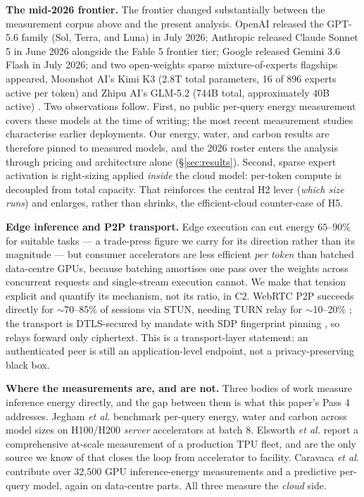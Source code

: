\documentclass[conference]{IEEEtran}
\begin{document}
\textbf{The mid-2026 frontier.}
The frontier changed substantially between the measurement corpus above and the
present analysis. OpenAI released the GPT-5.6 family (Sol, Terra, and Luna) in
July 2026; Anthropic released Claude Sonnet 5 in June 2026 alongside the Fable 5
frontier tier; Google released Gemini 3.6 Flash in July 2026; and two
open-weights sparse mixture-of-experts flagships appeared, Moonshot AI's Kimi K3
(2.8T total parameters, 16 of 896 experts active per token) and Zhipu AI's
GLM-5.2 (744B total, approximately 40B active) \cite{frontier2026,anthropic_pricing2026,google_pricing2026,openweights2026}. Two
observations follow. First, no public per-query energy measurement covers these
models at the time of writing; the most recent measurement studies
\cite{jegham2025,caravaca2025} characterise earlier deployments. Our energy,
water, and carbon results are therefore pinned to measured models, and the 2026
roster enters the analysis through pricing and architecture alone
(\S\ref{sec:results}). Second, sparse expert activation is right-sizing
applied \emph{inside} the cloud model: per-token compute is decoupled from total
capacity. That reinforces the central H2 lever (\emph{which size runs}) and
enlarges, rather than shrinks, the efficient-cloud counter-case of H5.

\textbf{Edge inference and P2P transport.}
Edge execution can cut energy $65$--$90\%$ for suitable tasks
\cite{techtarget2025} --- a trade-press figure we carry for its direction
rather than its magnitude --- but consumer accelerators are less efficient
\emph{per token} than batched data-centre GPUs, because batching amortises one
pass over the weights across concurrent requests and single-stream execution
cannot. We make that tension explicit and quantify its mechanism, not its
ratio, in C2. WebRTC P2P succeeds directly for $\sim$70--85\% of
sessions via STUN, needing TURN relay for $\sim$10--20\% \cite{antmedia2026}; the
transport is DTLS-secured by mandate with SDP fingerprint pinning
\cite{rfc8831,rfc8827}, so relays forward only ciphertext. This is a
transport-layer statement: an authenticated peer is still an application-level
endpoint, not a privacy-preserving black box.

\textbf{Where the measurements are, and are not.}
Three bodies of work measure inference energy directly, and the gap between them
is what this paper's Pass 4 addresses. Jegham \emph{et al.} \cite{jegham2025}
benchmark per-query energy, water and carbon across model sizes on H100/H200
\emph{server} accelerators at batch 8. Elsworth \emph{et al.} \cite{elsworth2025}
report a comprehensive at-scale measurement of a production TPU fleet, and are
the only source we know of that closes the loop from accelerator to facility.
Caravaca \emph{et al.} \cite{caravaca2025} contribute over 32{,}500 GPU
inference-energy measurements and a predictive per-query model, again on
data-centre parts. All three measure the \emph{cloud} side.
\end{document}

